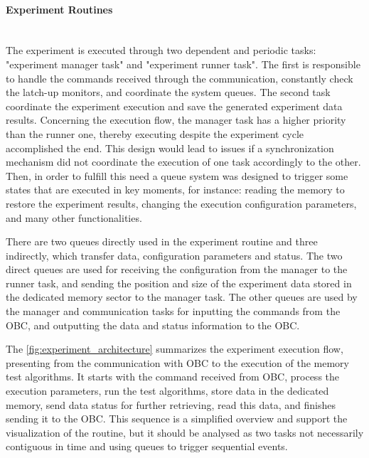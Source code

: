 \paragraph{Experiment Routines} \mbox{}\\

The experiment is executed through two dependent and periodic tasks: "experiment manager task" and "experiment runner task". The first is responsible to handle the commands received through the communication, constantly check the latch-up monitors, and coordinate the system queues. The second task coordinate the experiment execution and save the generated experiment data results. Concerning the execution flow, the manager task has a higher priority than the runner one, thereby executing despite the experiment cycle accomplished the end. This design would lead to issues if a synchronization mechanism did not coordinate the execution of one task accordingly to the other. Then, in order to fulfill this need a queue system was designed to trigger some states that are executed in key moments, for instance: reading the memory to restore the experiment results, changing the execution configuration parameters, and many other functionalities. 

There are two queues directly used in the experiment routine and three indirectly, which transfer data, configuration parameters and status. The two direct queues are used for receiving the configuration from the manager to the runner task, and sending the position and size of the experiment data stored in the dedicated memory sector to the manager task. The other queues are used by the manager and communication tasks for inputting the commands from the OBC, and outputting the data and status information to the OBC.  

The \autoref{fig:experiment_architecture} summarizes the experiment execution flow, presenting from the communication with OBC to the execution of the memory test algorithms. It starts with the command received from OBC, process the execution parameters, run the test algorithms, store data in the dedicated memory, send data status for further retrieving, read this data, and finishes sending it to the OBC. This sequence is a simplified overview and support the visualization of the routine, but it should be analysed as two tasks not necessarily contiguous in time and using queues to trigger sequential events.  

